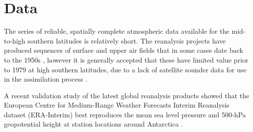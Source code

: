 \section{Data}\label{s:data}

The series of reliable, spatially complete atmospheric data available for the mid-to-high southern latitudes is relatively short. The reanalysis projects have produced sequences of surface and upper air fields that in some cases date back to the 1950s \citep[e.g.][]{Uppala2005,Kistler2001}, however it is generally accepted that these have limited value prior to 1979 at high southern latitudes, due to a lack of satellite sounder data for use in the assimilation process \citep{Hines2000}.

A recent validation study of the latest global reanalysis products showed that the European Centre for Medium-Range Weather Forecasts Interim Reanalysis dataset (ERA-Interim) best reproduces the mean sea level pressure and 500-hPa geopotential height at station locations around Antarctica \citep{Bracegirdle2012}.